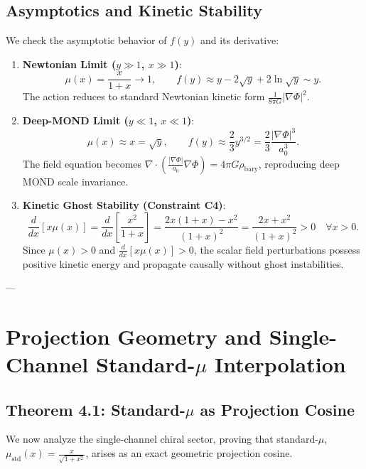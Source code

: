 \documentclass[11pt,a4paper]{article}
\theoremstyle{definition}
\begin{document}
\subsection{Asymptotics and Kinetic Stability}
We check the asymptotic behavior of $f(y)$ and its derivative:
\begin{enumerate}
\item \textbf{Newtonian Limit ($y \gg 1$, $x \gg 1$)}:
\begin{equation}
\mu(x) = \frac{x}{1+x} \to 1, \qquad f(y) \approx y - 2\sqrt{y} + 2\ln\sqrt{y} \sim y.
\end{equation}
The action reduces to standard Newtonian kinetic form $\frac{1}{8\pi G}|\nabla\Phi|^2$.
\item \textbf{Deep-MOND Limit ($y \ll 1$, $x \ll 1$)}:
\begin{equation}
\mu(x) \approx x = \sqrt{y}, \qquad f(y) \approx \frac{2}{3} y^{3/2} = \frac{2}{3} \frac{|\nabla\Phi|^3}{a_0^3}.
\end{equation}
The field equation becomes $\nabla \cdot \left( \frac{|\nabla\Phi|}{a_0} \nabla\Phi \right) = 4\pi G \rho_{\text{bary}}$, reproducing deep MOND scale invariance.
\item \textbf{Kinetic Ghost Stability (Constraint C4)}:
\begin{equation}
\frac{d}{dx}[x\mu(x)] = \frac{d}{dx}\left[ \frac{x^2}{1+x} \right] = \frac{2x(1+x) - x^2}{(1+x)^2} = \frac{2x + x^2}{(1+x)^2} > 0 \quad \forall x > 0.
\end{equation}
Since $\mu(x) > 0$ and $\frac{d}{dx}[x\mu(x)] > 0$, the scalar field perturbations possess positive kinetic energy and propagate causally without ghost instabilities.
\end{enumerate}

---

\section{Projection Geometry and Single-Channel Standard-$\mu$ Interpolation}

\subsection{Theorem 4.1: Standard-$\mu$ as Projection Cosine}
We now analyze the single-channel chiral sector, proving that standard-$\mu$, $\mu_{\text{std}}(x) = \frac{x}{\sqrt{1+x^2}}$, arises as an exact geometric projection cosine.
\end{document}
